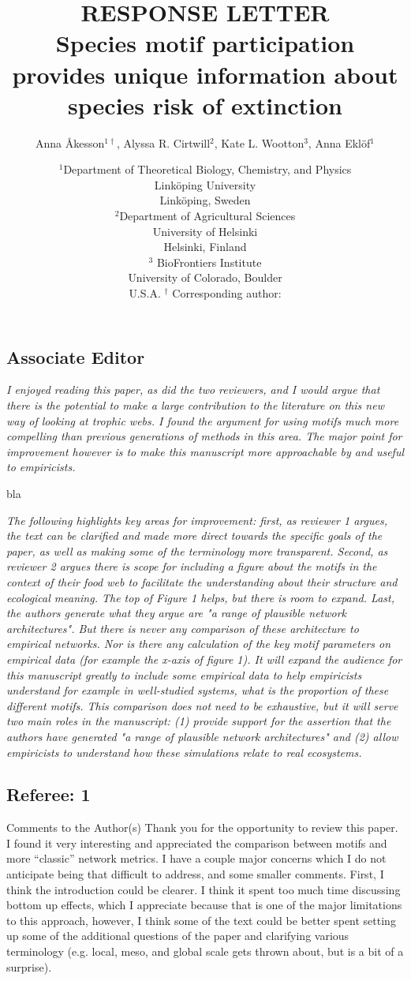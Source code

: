 \documentclass[12pt]{article}
\title{RESPONSE LETTER \\Species motif participation provides unique information about species risk of extinction}
\author{Anna \r{A}kesson$^{1\dagger}$, Alyssa R. Cirtwill$^{2}$, Kate L. Wootton$^{3}$, Anna Ekl\"{o}f$^{1}$}
\date{\small$^1$Department of Theoretical Biology, Chemistry, and Physics\\ 
Link\"{o}ping University\\
Link\"{o}ping, Sweden\\
\medskip
\small$^2$Department of Agricultural Sciences\\
University of Helsinki\\
Helsinki, Finland\\
\medskip
\small$^3$ BioFrontiers Institute\\
University of Colorado, Boulder\\
U.S.A.
\medskip
$^\dagger$ Corresponding author:\\
}
\newcommand{\us}{\rm \setlength{\leftskip}{0.3cm} \setlength{\rightskip}{0.3cm}}
\newcommand{\them}{\it \setlength{\leftskip}{0cm} \setlength{\rightskip}{0cm}}
\begin{document}
 
\maketitle 
\linenumbers
\raggedright

\setlength{\parindent}{15pt} 


\subsection*{Associate Editor}
\them
I enjoyed reading this paper, as did the two reviewers, and I would argue that there is the potential to make a large contribution to the literature on this new way of looking at trophic webs. I found the argument for using motifs much more compelling than previous generations of methods in this area.  The major point for improvement however is to make this manuscript more approachable by and useful to empiricists.  

\us
bla 

\them 
The following highlights key areas for improvement: first, as reviewer 1 argues, the text can be clarified and made more direct towards the specific goals of the paper, as well as making some of the terminology more transparent.  Second, as reviewer 2 argues there is scope for including a figure about the motifs in the context of their food web to facilitate the understanding about their structure and ecological meaning.  The top of Figure 1 helps, but there is room to expand.  Last, the authors generate what they argue are "a range of plausible network architectures".  But there is never any comparison of these architecture to empirical networks.  Nor is there any calculation of the key motif parameters on empirical data (for example the x-axis of figure 1). It will expand the audience for this manuscript greatly to include some empirical data to help empiricists understand for example in well-studied systems, what is the proportion of these different motifs.  This comparison does not need to be exhaustive, but it will serve two main roles in the manuscript: (1) provide support for the assertion that the authors have generated "a range of plausible network architectures" and (2) allow empiricists to understand how these simulations relate to real ecosystems.  

\subsection*{Referee: 1}

Comments to the Author(s)
Thank you for the opportunity to review this paper. I found it very interesting and appreciated the comparison between motifs and more “classic” network metrics. I have a couple major concerns which I do not anticipate being that difficult to address, and some smaller comments.
First, I think the introduction could be clearer. I think it spent too much time discussing bottom up effects, which I appreciate because that is one of the major limitations to this approach, however, I think some of the text could be better spent setting up some of the additional questions of the paper and clarifying various terminology (e.g. local, meso, and global scale gets thrown about, but is a bit of a surprise).
\end{document}
